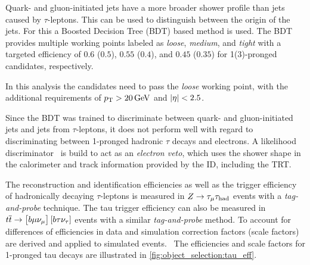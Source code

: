 Quark- and gluon-initiated jets have a more broader shower profile than jets caused by $\tau$-leptons.
This can be used to distinguish between the origin of the jets.
For this a Boosted Decision Tree (BDT) based method is used.
The BDT provides multiple working points labeled as \emph{loose}, \emph{medium}, and \emph{tight}
with a targeted efficiency of $0.6$ ($0.5$), $0.55$ ($0.4$), and $0.45$ ($0.35$) for 1(3)-pronged \tauhadvis{} candidates, respectively.

In this analysis the \tauhadvis{} candidates need to pass the \emph{loose} working point, with the additional requirements
of $\pt > \SI{20}{\GeV}$ and $\left|\eta\right| < 2.5$.

Since the BDT was trained to discriminate between quark- and gluon-initiated jets and jets from $\tau$-leptons, it
does not perform well with regard to discriminating between 1-pronged hadronic $\tau$ decays and electrons.
A likelihood discriminator~\cite{Run1TauPaper} is build to act as an \emph{electron veto}, which uses the shower shape in the calorimeter
and track information provided by the ID, including the TRT\@.

The reconstruction and identification efficiencies as well as the trigger efficiency of hadronically decaying $\tau$-leptons is measured in
$Z \to \tau_\mu \tau_\text{had}$ events with a \emph{tag-and-probe} technique.
The tau trigger efficiency can also be measured in $t\overline{t} \to \left[b\mu\nu_\mu\right]\left[b\tau\nu_\tau\right]$ events
with a similar \emph{tag-and-probe} method.
To account for differences of efficiencies in data and simulation correction factors (scale factors) are derived and applied to simulated
events.~\cite{ATL-PHYS-PUB-2015-045,ATLAS-CONF-2017-029}
The efficiencies and scale factors for 1-pronged tau decays are illustrated in \cref{fig:object_selection:tau_eff}.

